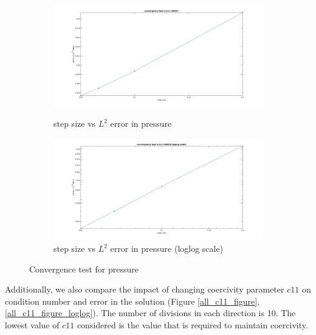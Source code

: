 \documentclass[a4paper,oneside,openright,spanish,english]{book}
\begin{document}
\begin{figure}
\begin{subfigure}{\textwidth}	
  \includegraphics[width=\linewidth]{step_size_vs_pressure_l2_error.jpg}
  \caption{step size vs $L^2$ error in pressure} 
  \label{step_size_vs_pressure_l2_error}
  \includegraphics[width=\linewidth]{step_size_vs_pressure_l2_error_loglog.jpg}
  \caption{step size vs $L^2$ error in pressure (loglog scale)} 
  \label{step_size_vs_pressure_l2_error_loglog}
\end{subfigure}
\caption{Convergence test for pressure}
\label{convergence_check_pressure}
\end{figure}

Additionally, we also compare the impact of changing coercivity parameter $c11$ on condition number and error in the solution (Figure \ref{all_c11_figure}, \ref{all_c11_figure_loglog}). The number of divisions in each direction is 10. The lowest value of $c11$ considered is the value that is required to maintain coercivity.
\end{document}
